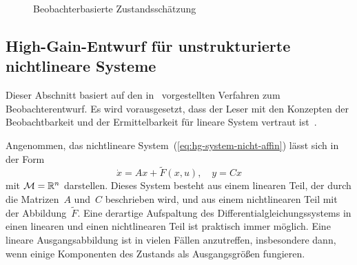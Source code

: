 \begin{figure}
\begin{centering}
\resizebox{0.6\textwidth}{!}{}
\par\end{centering}
\caption{Beobachterbasierte Zustandsschätzung\label{fig:beobachter-struktur}}
\end{figure}


\subsection{High-Gain-Entwurf für unstrukturierte nichtlineare Systeme}

Dieser Abschnitt basiert auf den in~\cite{thau1973,raghavan1994,zak1990,rajamani1998}
vorgestellten Verfahren zum Beobachterentwurf. Es wird vorausgesetzt,
dass der Leser mit den Konzepten der Beobachtbarkeit und der Ermittelbarkeit
für lineare System vertraut ist~\cite{ludyk1995-2,lunze-rt2}.

Angenommen, das nichtlineare System~(\ref{eq:hg-system-nicht-affin})
lässt sich in der Form 
\begin{equation}
\dot{x}=Ax+\widetilde{F}(x,u),\quad y=Cx\label{eq:hg-system-rajamani}
\end{equation}
mit $\mathcal{M}={\mathbb{R}}^{n}$ darstellen. Dieses System besteht aus einem
linearen Teil, der durch die Matrizen~$A$ und~$C$ beschrieben
wird, und aus einem nichtlinearen Teil mit der Abbildung~$\widetilde{F}$.
Eine derartige Aufspaltung des Differential\-gleichungs\-systems
in einen linearen und einen nichtlinearen Teil ist praktisch immer
möglich. Eine lineare Ausgangsabbildung ist in vielen Fällen anzutreffen,
insbesondere dann, wenn einige Komponenten des Zustands als Ausgangsgrößen
fungieren.

